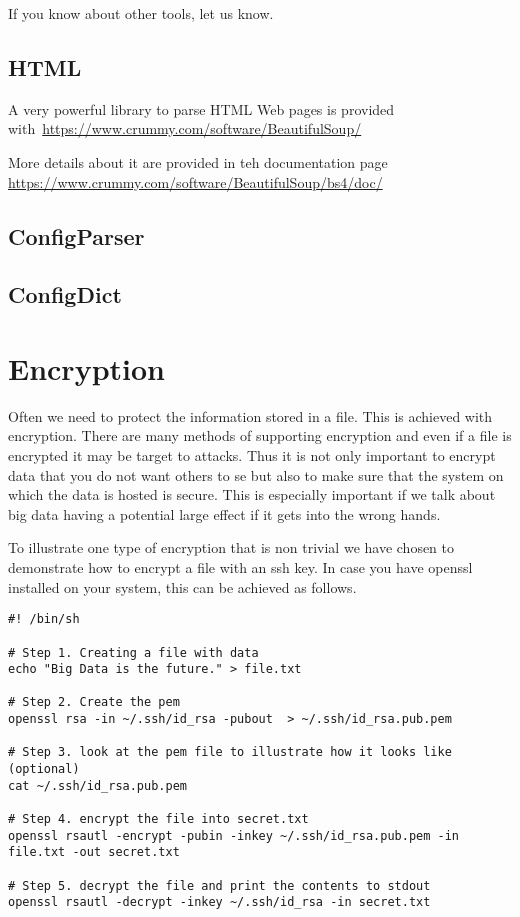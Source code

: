 If you know about other tools, let us know.


\subsection{HTML}

A very powerful library to parse HTML Web pages is provided
with~\url{https://www.crummy.com/software/BeautifulSoup/}

More details about it are provided in teh documentation page
\url{https://www.crummy.com/software/BeautifulSoup/bs4/doc/}


\subsection{ConfigParser}


\subsection{ConfigDict}


\section{Encryption}

Often we need to protect the information stored in a file. This is
achieved with encryption. There are many methods of supporting
encryption and even if a file is encrypted it may be target to
attacks. Thus it is not only important to encrypt data that you do not
want others to se but also to make sure that the system on which the
data is hosted is secure. This is especially important if we talk
about big data having a potential large effect if it gets into the
wrong hands. 

To illustrate one type of encryption that is non trivial we have
chosen to demonstrate how to encrypt a file with an ssh key. In case
you have openssl installed on your system, this can be achieved as follows.


\begin{verbatim}
#! /bin/sh

# Step 1. Creating a file with data
echo "Big Data is the future." > file.txt

# Step 2. Create the pem 
openssl rsa -in ~/.ssh/id_rsa -pubout  > ~/.ssh/id_rsa.pub.pem

# Step 3. look at the pem file to illustrate how it looks like (optional)
cat ~/.ssh/id_rsa.pub.pem

# Step 4. encrypt the file into secret.txt
openssl rsautl -encrypt -pubin -inkey ~/.ssh/id_rsa.pub.pem -in file.txt -out secret.txt

# Step 5. decrypt the file and print the contents to stdout
openssl rsautl -decrypt -inkey ~/.ssh/id_rsa -in secret.txt
\end{verbatim}

